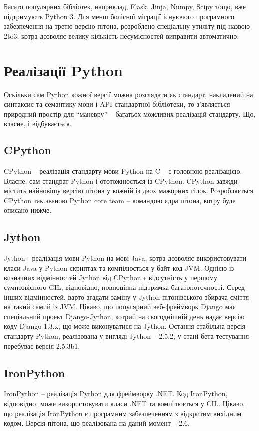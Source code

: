 \documentclass[a4paper, 12pt, onsedie]{article}
\begin{document}
    Багато популярних бібліотек, наприклад, Flask, Jinja, Numpy, Scipy тощо, вже підтримують
    Python 3. Для менш болісної міграції існуючого програмного забезпечення на третю версію
    пітона, розроблено спеціальну утиліту під назвою 2to3, котра дозволяє велику кількість
    несумісностей виправити автоматично.

\section{Реалізації Python}
    Оскільки сам Python кожної версії можна розглядати як стандарт, накладений на синтаксис та
    семантику мови і API стандартної бібліотеки, то з'являється природний простір для ``маневру''
     -- багатьох можливих реалізацій стандарту. Що, власне, і відбувається.

\subsection{CPython}
    CPython -- реалізація стандарту мови Python на C -- є головною реалізацією. Власне, сам
    стандрат Python і ототожнюється із CPython. CPython завжди містить найновішу версію пітона 
    у кожній із двох мажорних гілок. Розробляється CPython так званою Python core team -- 
    командою ядра пітона, котру буде описано нижче.


\subsection{Jython}
    Jython - реалізація мови Python на мові Java, котра дозволяє використовувати класи Java у 
    Python-скриптах та компілюється у байт-код JVM. Однією із визначних відмінностей Jython від
    CPython є відсутність у першому сумнозвісного GIL, відповідно, повноцінна підтримка 
    багатопоточності. Серед інших відмінностей, варто згадати заміну у Jython пітонівського 
    збирача сміття на такий самий із JVM.
    Цікаво, що популярний веб-фреймворк Django має спеціальний проект Django-Jython, котрий на
    сьогоднішній день надає версію коду Django 1.3.x, що може виконуватися на Jython.
    Остання стабільна версія стандарту Python, реалізована у вигляді Jython -- 2.5.2, у стані 
    бета-тестування перебуває версія 2.5.3b1.

\subsection{IronPython}
    IronPython -- реалізація Python для фреймворку .NET. Код IronPython, відповідно, може 
    використовувати класи .NET та компілюється у CIL. Цікаво, що реалізація IronPython є 
    програмним забезпеченням з відкритим вихідним кодом. Версія пітона, що реалізована на даний 
    момент -- 2.6.
\end{document}

